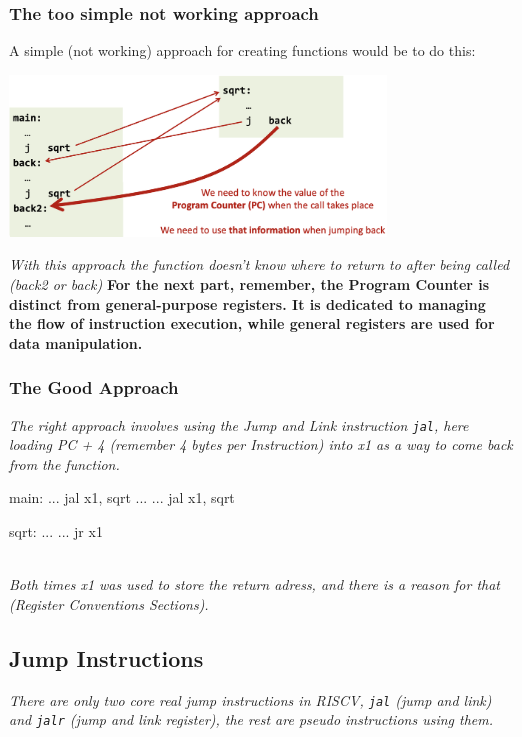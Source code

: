 \subsubsection{The too simple not working approach}
A simple (not working) approach for creating functions would be to do this: 
\begin{center}
    \includegraphics[width=0.75\textwidth]{chapters/chapter1b/images/function.png}
\end{center}
\textit{With this approach the function doesn't know where to return to after being called (back2 or back)}
\textbf{For the next part, remember, the Program Counter is distinct from general-purpose registers. It is dedicated to managing the flow of instruction execution, while general registers are used for data manipulation. }
\subsubsection{The Good Approach}
\textit{The right approach involves using the Jump and Link instruction \texttt{jal}, here loading PC + 4 (remember 4 bytes per Instruction) into x1 as a way to come back from the function.} \\
\begin{minipage}[htp]{0.4\textwidth}
\begin{assembly}
main:
    ...
    jal x1, sqrt
    ...
    ...
    jal x1, sqrt
\end{assembly}    
\end{minipage}
\hfill
\vline
\hfill
\begin{minipage}[htp]{0.4\textwidth}
\begin{assembly}
sqrt:
    ...
    ...
    jr x1
\end{assembly}
\end{minipage} \\
\textit{Both times x1 was used to store the return adress, and there is a reason for that (Register Conventions Sections).}

\subsection{Jump Instructions}
\textit{There are only two core real jump instructions in RISCV, \texttt{jal} (jump and link) and \texttt{jalr} (jump and link register), the rest are pseudo instructions using them.} \\

